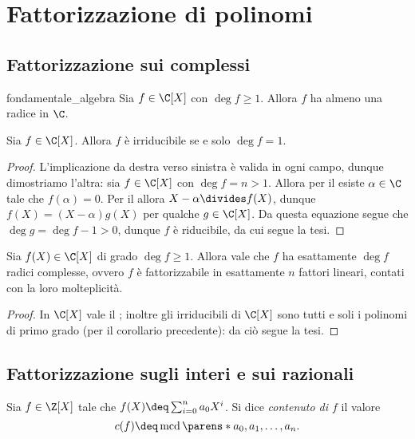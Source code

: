 \section{Fattorizzazione di polinomi}

\subsection{Fattorizzazione sui complessi}

\begin{theorem} {fondamentale_algebra}
    Sia $f \in \C[X]$ con $\deg f \geq 1$. Allora $f$ ha almeno una radice in $\C$.
\end{theorem}

\begin{corollary}
     Sia $f \in \C[X]$. Allora $f$ è irriducibile se e solo $\deg f = 1$.
\end{corollary}
\begin{proof}
    L'implicazione da destra verso sinistra è valida in ogni campo, dunque dimostriamo l'altra: sia $f \in \C[X]$ con $\deg f = n > 1$. Allora per il  esiste $\alpha \in \C$ tale che $f(\alpha) = 0$. Per il  allora $X-\alpha \divides f(X)$, dunque $f(X) = (X-\alpha)g(X)$ per qualche $g \in \C[X]$. Da questa equazione segue che $\deg g = \deg f - 1 > 0$, dunque $f$ è riducibile, da cui segue la tesi.
\end{proof}

\begin{corollary}
    Sia $f(X) \in \C[X]$ di grado $\deg f \geq 1$. Allora vale che $f$ ha esattamente $\deg f$ radici complesse, ovvero $f$ è fattorizzabile in esattamente $n$ fattori lineari, contati con la loro molteplicità.
\end{corollary}
\begin{proof}
    In $\C[X]$ vale il ; inoltre gli irriducibili di $\C[X]$ sono tutti e soli i polinomi di primo grado (per il corollario precedente): da ciò segue la tesi.
\end{proof}

\subsection{Fattorizzazione sugli interi e sui razionali}

\begin{definition}
    Sia $f \in \Z[X]$ tale che $f(X) \deq \sum_{i=0}^n a_0X^i$. Si dice \emph{contenuto di $f$} il valore \[
        c(f) \deq \operatorname{mcd}\parens*{a_0, a_1, \dots, a_n}. 
    \]
\end{definition}

